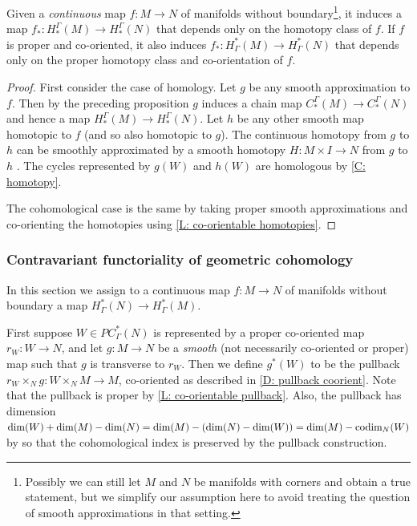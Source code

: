 \begin{proposition}\label{P: homology homotopy functor}
Given a \textit{continuous} map $f \colon M \to N$ of manifolds without boundary\footnote{Possibly we can still let $M$ and $N$ be manifolds with corners and obtain a true statement, but we simplify our assumption here to avoid treating the question of smooth approximations in that setting.}, it induces a map $f_*:H_*^\Gamma(M) \to H_*^\Gamma(N)$ that depends only on the homotopy class of $f$. If $f$ is proper and co-oriented, it also induces $f_*:H^*_\Gamma(M) \to H^*_\Gamma(N)$ that depends only on the proper homotopy class and co-orientation of $f$.
\end{proposition}
\begin{proof}
First consider the case of homology. Let $g$ be any smooth approximation to $f$. Then by the preceding proposition $g$ induces a chain map $C_*^\Gamma(M) \to C_*^\Gamma(N)$ and hence a map $H_*^\Gamma(M) \to H_*^\Gamma(N)$. Let $h$ be any other smooth map homotopic to $f$ (and so also homotopic to $g$). The continuous homotopy from $g$ to $h$ can be smoothly approximated by a smooth homotopy $H:M \times I \to N$ from $g$ to $h$ \cite[Theorem III.2.5]{Kos93}. The cycles represented by $g(W)$ and $h(W)$ are homologous by \cref{C: homotopy}.

The cohomological case is the same by taking proper smooth approximations and co-orienting the homotopies using \cref{L: co-orientable homotopies}.
\end{proof}




\subsubsection{Contravariant functoriality of geometric cohomology}\label{S: cohomology pullback}

In this section we assign to a continuous map $f \colon M \to N$ of manifolds without boundary a map $H^*_\Gamma(N) \to H^*_\Gamma(M)$.

First suppose $W \in PC^*_\Gamma(N)$ is represented by a proper co-oriented map $r_W \colon W \to N$, and let
$g \colon M \to N$ be a \textit{smooth} (not necessarily co-oriented or proper) map such that $g$ is transverse to $r_W$. Then we define $g^*(W)$ to be the pullback $r_W\times_N g:W\times_N M \to M$, co-oriented as described in \cref{D: pullback coorient}. Note that the pullback is proper by \cref{L: co-orientable pullback}. Also, the pullback has dimension $\dim(W)+\dim(M)-\dim(N) = \dim(M)-(\dim(N)-\dim(W)) = \dim(M)-\text{codim}_N(W)$ by \cite[Theorem 6.4]{Joy12} so that the cohomological index is preserved by the pullback construction.

